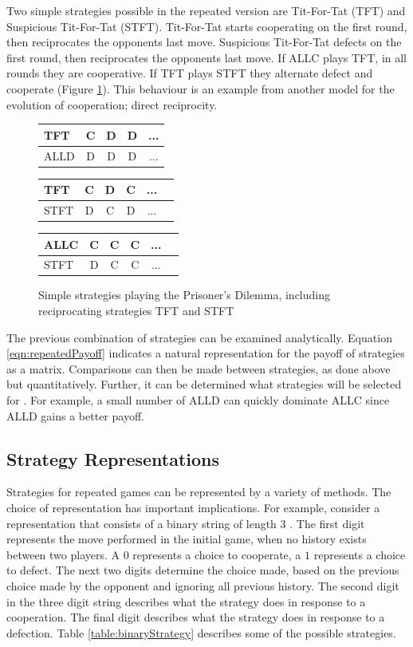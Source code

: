 \documentclass[a4paper,11pt,bcshonoursthesis,singlespace,twoside]{cssethesis}
\begin{document}
Two simple strategies possible in the repeated version are Tit-For-Tat (TFT) and Suspicious Tit-For-Tat (STFT). 
Tit-For-Tat starts cooperating on the first round, then reciprocates the opponents last move. 
Suspicious Tit-For-Tat defects on the first round, then reciprocates the opponents last move. 
If ALLC plays TFT, in all rounds they are cooperative.  
If TFT plays STFT they alternate defect and cooperate (Figure \ref{table:reciprocity}). 
This behaviour is an example from another model for the evolution of cooperation; direct reciprocity. 

\begin{figure}[h]
\centering
\captionsetup{justification=centering}
\begin{tabular}{|l|c|c|c|c|}
\hline
TFT & C & D & D&...\\
\hline
ALLD & D & D &D&...\\
\hline
\end{tabular}\hfill
\begin{tabular}{|l|c|c|c|c|c|}
\hline
TFT & C & D&C&...\\
\hline
STFT & D & C&D&...\\
\hline
\end{tabular}\hfill
\begin{tabular}{|l|c|c|c|c|c|}
\hline
ALLC & C & C&C&...\\
\hline
STFT & D & C&C&...\\
\hline
\end{tabular}\hfill
\caption{Simple strategies playing the Prisoner's Dilemma, including reciprocating strategies TFT and STFT }
\label{table:reciprocity}
\end{figure}

The previous combination of strategies can be examined analytically. 
Equation \ref{eqn:repeatedPayoff} indicates a natural representation for the payoff of strategies as a matrix. 
Comparisons can then be made between strategies, as done above but quantitatively. 
Further, it can be determined what strategies will be selected for \citep{imhof:PNAS:2005}. 
For example, a small number of ALLD can quickly dominate ALLC since ALLD gains a better payoff. 

\subsection{Strategy Representations}
Strategies for repeated games can be represented by a variety of methods. The choice of representation has important implications. 
For example, consider a representation that consists of a binary string of length 3 \citep{garcia:PLoSOne:2012}. 
The first digit represents the move performed in the initial game, when no history exists between two players. 
A $0$ represents a choice to cooperate, a $1$ represents a choice to defect. 
The next two digits determine the choice made, based on the previous choice made by the opponent and ignoring all previous history. 
The second digit in the three digit string describes what the strategy does in response to a cooperation. 
The final digit describes what the strategy does in response to a defection. 
Table \ref{table:binaryStrategy} describes some of the possible strategies.
\end{document}
